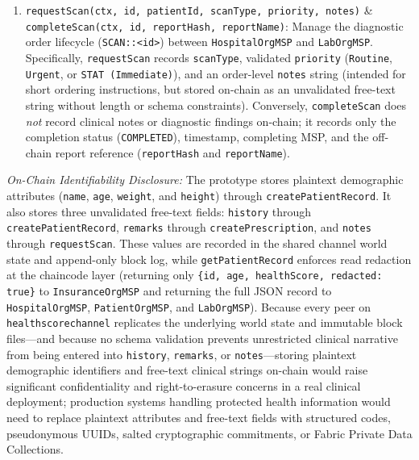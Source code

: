 \documentclass[runningheads]{llncs}
\begin{document}
\begin{enumerate}
    \item \texttt{requestScan(ctx, id, patientId, scanType, priority, notes)} \& \texttt{completeScan(ctx, id, reportHash, reportName)}: Manage the diagnostic order lifecycle (\texttt{SCAN::<id>}) between \texttt{HospitalOrgMSP} and \texttt{LabOrgMSP}. Specifically, \texttt{requestScan} records \texttt{scanType}, validated \texttt{priority} (\texttt{Routine}, \texttt{Urgent}, or \texttt{STAT (Immediate)}), and an order-level \texttt{notes} string (intended for short ordering instructions, but stored on-chain as an unvalidated free-text string without length or schema constraints). Conversely, \texttt{completeScan} does \textit{not} record clinical notes or diagnostic findings on-chain; it records only the completion status (\texttt{COMPLETED}), timestamp, completing MSP, and the off-chain report reference (\texttt{reportHash} and \texttt{reportName}).
\end{enumerate}

\noindent\textit{On-Chain Identifiability Disclosure:} The prototype stores plaintext demographic attributes (\texttt{name}, \texttt{age}, \texttt{weight}, and \texttt{height}) through \texttt{createPatientRecord}. It also stores three unvalidated free-text fields: \texttt{history} through \texttt{createPatientRecord}, \texttt{remarks} through \texttt{createPrescription}, and \texttt{notes} through \texttt{requestScan}. These values are recorded in the shared channel world state and append-only block log, while \texttt{getPatientRecord} enforces read redaction at the chaincode layer (returning only \texttt{\{id, age, healthScore, redacted: true\}} to \texttt{InsuranceOrgMSP} and returning the full JSON record to \texttt{HospitalOrgMSP}, \texttt{PatientOrgMSP}, and \texttt{LabOrgMSP}). Because every peer on \texttt{healthscorechannel} replicates the underlying world state and immutable block files---and because no schema validation prevents unrestricted clinical narrative from being entered into \texttt{history}, \texttt{remarks}, or \texttt{notes}---storing plaintext demographic identifiers and free-text clinical strings on-chain would raise significant confidentiality and right-to-erasure concerns in a real clinical deployment; production systems handling protected health information would need to replace plaintext attributes and free-text fields with structured codes, pseudonymous UUIDs, salted cryptographic commitments, or Fabric Private Data Collections.
\end{document}
